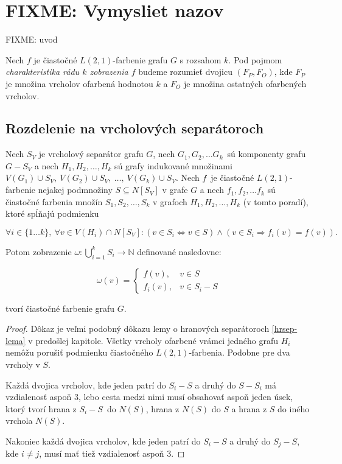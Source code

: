 \chapter{FIXME: Vymysliet nazov}

FIXME: uvod

\begin{defn}
    Nech $f$ je čiastočné $L(2,1)$-farbenie grafu $G$ s rozsahom $k$. Pod pojmom \emph{charakteristika rádu $k$
    zobrazenia $f$} budeme rozumieť dvojicu $(F_P, F_O)$, kde $F_P$ je množina vrcholov ofarbená
    hodnotou $k$ a $F_O$ je množina ostatných ofarbených vrcholov.
\end{defn}



\section{Rozdelenie na vrcholových separátoroch}

\begin{lema}
    Nech $S_V$ je vrcholový separátor grafu $G$, nech $G_1, G_2, \ldots G_k$ sú komponenty
    grafu $G - S_V$ a nech $H_1, H_2, \ldots, H_k$ sú grafy indukované množinami $V(G_1) \cup S_V,\ V(G_2) \cup S_V,\ \ldots,\ V(G_k) \cup S_V$.
    Nech $f$ je čiastočné $L(2,1)$-farbenie nejakej podmnožiny $S \subseteq N[S_V]$ v grafe $G$ a nech $f_1, f_2, \ldots f_k$
    sú čiastočné farbenia množín $S_1, S_2, \ldots, S_k$ v grafoch $H_1, H_2, \ldots, H_k$ (v tomto poradí), ktoré spĺňajú podmienku

    $$ \forall i \in \{1 \ldots k\},\ \forall v \in V(H_i) \cap N[S_V]: (v \in S_i \Leftrightarrow v \in S) \wedge (v \in S_i \Rightarrow f_i(v) = f(v)).$$

    Potom zobrazenie $\omega: \bigcup \limits_{i=1}^k S_i \to \mathbb{N}$ definované nasledovne:

    \[ \omega(v) =
    \begin{cases}
        f(v), & v \in S \\
        f_i(v), & v \in S_i - S
    \end{cases}
    \]

    tvorí čiastočné farbenie grafu $G$.
\end{lema}

\begin{proof}
    Dôkaz je veľmi podobný dôkazu lemy o hranových separátoroch \ref{hrsep-lema} v predošlej kapitole. Všetky
    vrcholy ofarbené vrámci jedného grafu $H_i$ nemôžu porušiť podmienku čiastočného $L(2,1)$-farbenia. Podobne
    pre dva vrcholy v $S$.
    
    Každá dvojica vrcholov, kde jeden patrí do $S_i - S$ a druhý do $S - S_i$ má vzdialenosť
    aspoň $3$, lebo cesta medzi nimi musí obsahovať aspoň jeden úsek, ktorý tvorí hrana z $S_i - S$ do $N(S)$, hrana
    z $N(S)$ do $S$ a hrana z $S$ do iného vrchola $N(S)$.

    Nakoniec každá dvojica vrcholov, kde jeden patrí do $S_i - S$ a druhý do $S_j - S$, kde $i \neq j$, musí mať tiež
    vzdialenosť aspoň $3$.
\end{proof}
